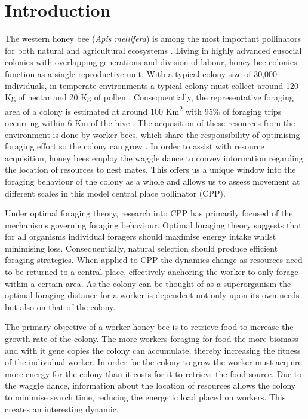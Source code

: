 \documentclass[11pt,usenames,dvipsnames]{article}
\begin{document}
\section{Introduction}

The western honey bee (\textit{Apis mellifera}) is among the most important pollinators for both natural and agricultural ecosystems \citep{Albrecht2018}. Living in highly advanced eusocial colonies with overlapping generations and division of labour, honey bee colonies function as a single reproductive unit. With a typical colony size of 30,000 individuals, in temperate environments a typical colony must collect around 120 Kg of nectar and 20 Kg of pollen \citep{Seeley1995}. Consequentially, the representative foraging area of a colony is estimated at around 100 Km\textsuperscript{2} with 95\% of foraging trips occurring within 6 Km of the hive \citep{Samuelson2017}. The acquisition of these resources from the environment is done by worker bees, which share the responsibility of optimising foraging effort so the colony can grow \citep{Samuelson2017}. In order to assist with resource acquisition, honey bees employ the waggle dance to convey information regarding the location of resources to nest mates. This offers us a unique window into the foraging behaviour of the colony as a whole and allows us to assess movement at different scales in this model central place pollinator (CPP). 

Under optimal foraging theory, research into CPP has primarily focused of the mechanisms governing foraging behaviour. Optimal foraging theory suggests that for all organisms individual foragers should maximise energy intake whilst minimising loss. Consequentially, natural selection should produce efficient foraging strategies. When applied to CPP the dynamics change as resources need to be returned to a central place, effectively anchoring the worker to only forage within a certain area. As the colony can be thought of as a superorganism \citep{Holldobler2009} the optimal foraging distance for a worker is dependent not only upon its own needs but also on that of the colony. 

The primary objective of a worker honey bee is to retrieve food to increase the growth rate of the colony. The more workers foraging for food the more biomass and with it gene copies the colony can accumulate, thereby increasing the fitness of the individual worker. In order for the colony to grow the worker must acquire more energy for the colony than it costs for it to retrieve the food source. Due to the waggle dance, information about the location of resources allows the colony to minimise search time, reducing the energetic load placed on workers. This creates an interesting dynamic. 
\end{document}
